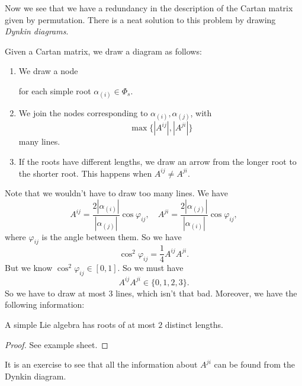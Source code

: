 \documentclass[a4paper]{article}
\begin{document}
Now we see that we have a redundancy in the description of the Cartan matrix given by permutation. There is a neat solution to this problem by drawing \emph{Dynkin diagrams}.
\begin{defi}
  Given a Cartan matrix, we draw a diagram as follows:
  \begin{enumerate}
    \item We draw a node
      \begin{center}
      \end{center}
      for each simple root $\alpha_{(i)} \in \Phi_s$.
    \item We join the nodes corresponding to $\alpha_{(i)}, \alpha_{(j)}$, with
      \[
        \max\{|A^{ij}|, |A^{ji}|\}
      \]
      many lines.
    \item If the roots have different lengths, we draw an arrow from the longer root to the shorter root. This happens when $A^{ij} \not= A^{ji}$.
  \end{enumerate}
\end{defi}
Note that we wouldn't have to draw too many lines. We have
\[
  A^{ij} = \frac{2|\alpha_{(i)}|}{|\alpha_{(j)}|} \cos \varphi_{ij},\quad A^{ji} = \frac{2|\alpha_{(j)}|}{|\alpha_{(i)}|} \cos \varphi_{ij},
\]
where $\varphi_{ij}$ is the angle between them. So we have
\[
  \cos^2 \varphi_{ij} = \frac{1}{4} A^{ij} A^{ji}.
\]
But we know $\cos^2 \varphi_{ij} \in [0, 1]$. So we must have
\[
  A^{ij} A^{ji} \in \{0, 1, 2, 3\}.
\]
So we have to draw at most $3$ lines, which isn't that bad. Moreover, we have the following information:
\begin{prop}
  A simple Lie algebra has roots of at most $2$ distinct lengths.
\end{prop}

\begin{proof}
  See example sheet.
\end{proof}

It is an exercise to see that all the information about $A^{ji}$ can be found from the Dynkin diagram.
\end{document}
